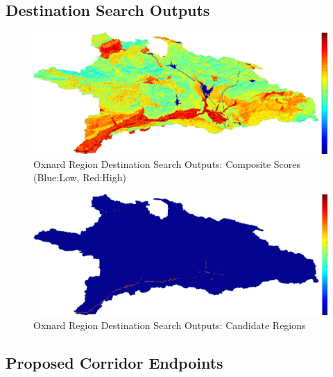     \subsection{Destination Search Outputs}
    
        \begin{figure}[!h]
            \begin{center}
            \includegraphics[width=5.5in]{figures/Oxnard_Search_Composite.png}   
            \caption{Oxnard Region Destination Search Outputs: Composite Scores (Blue:Low, Red:High)}
            \label{fig:Odsoutputs_comp}
            \end{center}
        \end{figure}
        
        \begin{figure}[!h]
            \begin{center}
            \includegraphics[width=5.5in]{figures/Oxnard_Search_Output.png}   
            \caption{Oxnard Region Destination Search Outputs: Candidate Regions}
            \label{fig:Odsoutputs_cand}
            \end{center}
        \end{figure}

    \subsection{Proposed Corridor Endpoints}
    
